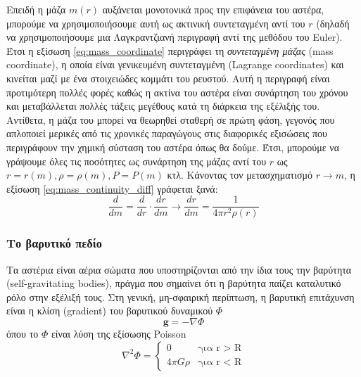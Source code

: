 Επειδή η μάζα $m(r)$ αυξάνεται μονοτονικά προς την επιφάνεια του αστέρα, μπορούμε να χρησιμοποιήσουμε αυτή ως ακτινική συντεταγμένη αντί του $r$ (δηλαδή να χρησιμοποιήσουμε μια Λαγκραντζιανή περιγραφή αντί της μεθόδου του Euler). Έτσι η εξίσωση \eqref{eq:mass_coordinate} περιγράφει τη \textit{συντεταγμένη μάζας} (mass coordinate), η οποία είναι γενικευμένη συντεταγμένη (Lagrange coordinates) και κινείται μαζί με ένα στοιχειώδες κομμάτι του ρευστού. Αυτή η περιγραφή είναι προτιμότερη πολλές φορές καθώς η ακτίνα του αστέρα είναι συνάρτηση του χρόνου και μεταβάλλεται πολλές τάξεις μεγέθους κατά τη διάρκεια της εξέλιξής του.
Αντίθετα, η μάζα του μπορεί να θεωρηθεί σταθερή σε πρώτη φάση, γεγονός που απλοποιεί μερικές από τις χρονικές παραγώγους στις διαφορικές εξισώσεις που περιγράφουν την χημική σύσταση του αστέρα όπως θα δούμε. Έτσι, μπορούμε να γράψουμε όλες τις ποσότητες ως συνάρτηση της μάζας αντί του $r$ ως $r = r(m), \rho = \rho(m), P = P(m)$ κτλ. Κάνοντας τον μετασχηματισμό $r \rightarrow m$, η εξίσωση \eqref{eq:mass_continuity_diff} γράφεται ξανά:
\begin{equation}
    \label{eq:mass_continuity_diff_dm}
    \frac{d}{dm} = \frac{d}{dr} \cdot \frac{dr}{dm}  \longrightarrow \boxed{\frac{dr}{dm} = \frac{1}{4\pi r^2 \rho (r)}}
\end{equation}
\subsubsection{Το βαρυτικό πεδίο}
Τα αστέρια είναι αέρια σώματα που υποστηρίζονται από την ίδια τους την βαρύτητα (self-gravitating bodies), πράγμα που σημαίνει ότι η βαρύτητα παίζει καταλυτικό ρόλο στην εξέλιξή τους. Στη γενική, μη-σφαιρική περίπτωση, η βαρυτική επιτάχυνση είναι η κλίση (gradient) του βαρυτικού δυναμικού $\Phi$
$$\boldsymbol{g} = - \nabla \Phi$$
όπου το $\Phi$ είναι λύση της εξίσωσης Poisson 
\begin{equation}
    \label{eq:poisson_equation}
    \nabla^2 \Phi = 
    \begin{cases}
        0 & \text{για r > R}\\
        4\pi G \rho & \text{για r < R}
    \end{cases}
\end{equation}

